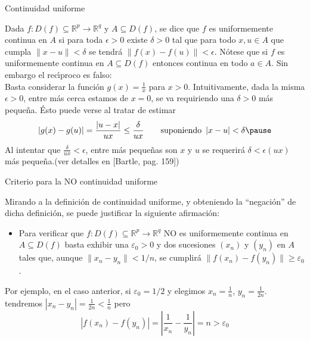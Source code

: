 \documentclass[xcolor=dvipsnames,10pt,handout, draft]{beamer}
\newcommand{\rzp}{\mathbb R^{p}}
\newcommand{\rzq}{\mathbb R^{q}}
\begin{document}
\begin{frame}{Continuidad uniforme}

Dada $f:D(f)\subseteq\rzp\to\rzq$ y $A\subseteq D(f)$, se dice que $f$ es uniformemente continua en $A$ si para toda $\epsilon>0$ existe $\delta>0$  tal que para todo $x,u\in A$ que cumpla $\|x-u\|<\delta$ se tendr\'a $\|f(x)-f(u)\|<\epsilon$.
\vskip4pt\pause
N\'otese que si $f$ es uniformemente continua en $A\subseteq D(f)$ entonces continua en todo $a\in A$. 
\vskip4pt\pause
Sin embargo el rec\'\i proco es falso:\pause\\
Basta considerar la funci\'on $\displaystyle g(x)=\frac{1}{x}$ para $x>0$.\pause\vskip4pt
Intuitivamente, dada la misma $\epsilon>0$, entre m\'as cerca estamos de $x=0$, se va requiriendo una $\delta>0$ m\'as peque\~na. \pause \'Esto puede verse al tratar de estimar
$$|g(x)-g(u)|=\frac{|u-x|}{ux}\leq\frac{\delta}{ux}\qquad\text{suponiendo }\, |x-u|<\delta\pause$$
Al intentar que $\displaystyle \frac{\delta}{ux}<\epsilon$, entre m\'as peque\~nas son $x$ y $u$ se requerir\'a $\delta<\epsilon (ux)$ m\'as peque\~na.\hskip2cm{\color{blue!77!black}(ver detalles en [Bartle, pag. 159])}

\end{frame}



\begin{frame}{Criterio para la NO continuidad uniforme}

Mirando a la definici\'on de continuidad uniforme, y obteniendo la ``negaci\'on'' de dicha definici\'on, se puede justificar la siguiente afirmaci\'on:\pause\vskip4pt
\begin{itemize}
\item Para verificar que $f:D(f)\subseteq\rzp\to\rzq$ NO es uniformemente continua en $A\subseteq D(f)$ basta exhibir una $\varepsilon_0>0$ y dos sucesiones $(x_n)$ y $(y_n)$ en $A$ tales que, aunque $\|x_n-y_n\|<1/n$, se cumplir\'a $\|f(x_n)-f(y_n)\|\geq\varepsilon_0$.\pause
\end{itemize}
Por ejemplo, en el caso anterior, si $\varepsilon_0=1/2$ y elegimos $\displaystyle x_n=\frac{1}{n}$, $\displaystyle y_n=\frac{1}{2n}$. \pause tendremos $\displaystyle|x_n-y_n|=\frac{1}{2n}<\frac{1}{n}$ \pause pero 
$$|f(x_n)-f(y_n)|=\left|\frac{1}{x_n}-\frac{1}{y_n}\right|=n>\varepsilon_0$$

\end{frame}
\end{document}
